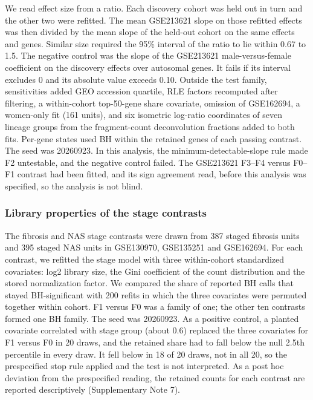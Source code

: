 We read effect size from a ratio. Each discovery cohort was held out in turn and the other two were refitted. The mean GSE213621 slope on those refitted effects was then divided by the mean slope of the held-out cohort on the same effects and genes. Similar size required the 95\% interval of the ratio to lie within 0.67 to 1.5. The negative control was the slope of the GSE213621 male-versus-female coefficient on the discovery effects over autosomal genes. It fails if its interval excludes 0 and its absolute value exceeds 0.10. Outside the test family, sensitivities added GEO accession quartile, RLE factors recomputed after filtering, a within-cohort top-50-gene share covariate, omission of GSE162694, a women-only fit (161 units), and six isometric log-ratio coordinates of seven lineage groups from the fragment-count deconvolution fractions added to both fits. Per-gene states used BH within the retained genes of each passing contrast. The seed was 20260923. In this analysis, the minimum-detectable-slope rule made F2 untestable, and the negative control failed. The GSE213621 F3--F4 versus F0--F1 contrast had been fitted, and its sign agreement read, before this analysis was specified, so the analysis is not blind.

\subsubsection{Library properties of the stage contrasts}\label{library-properties-of-the-stage-contrasts}

The fibrosis and NAS stage contrasts were drawn from 387 staged fibrosis units and 395 staged NAS units in GSE130970, GSE135251 and GSE162694. For each contrast, we refitted the stage model with three within-cohort standardized covariates: log2 library size, the Gini coefficient of the count distribution and the stored normalization factor. We compared the share of reported BH calls that stayed BH-significant with 200 refits in which the three covariates were permuted together within cohort. F1 versus F0 was a family of one; the other ten contrasts formed one BH family. The seed was 20260923. As a positive control, a planted covariate correlated with stage group (about 0.6) replaced the three covariates for F1 versus F0 in 20 draws, and the retained share had to fall below the null 2.5th percentile in every draw. It fell below in 18 of 20 draws, not in all 20, so the prespecified stop rule applied and the test is not interpreted. As a post hoc deviation from the prespecified reading, the retained counts for each contrast are reported descriptively (Supplementary Note 7).


